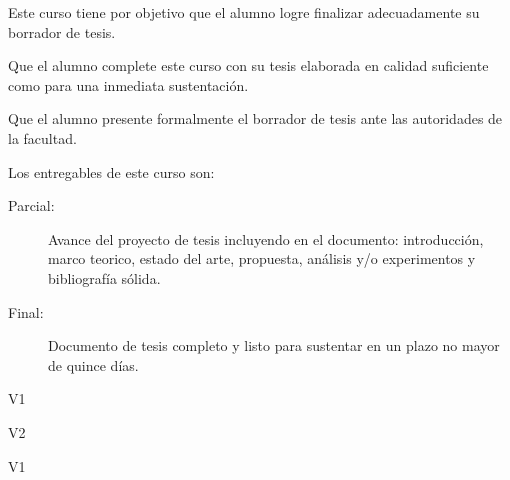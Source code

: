 \begin{syllabus}


\begin{justification}
Este curso tiene por objetivo que el alumno logre finalizar adecuadamente su borrador de tesis.
\end{justification}

\begin{goals}
\item Que el alumno complete este curso con su tesis elaborada en calidad suficiente como para una inmediata sustentación.
\item Que el alumno presente formalmente el borrador de tesis ante las autoridades de la facultad.
\item Los entregables de este curso son:
	\begin{description}
	\item [Parcial:] Avance del proyecto de tesis incluyendo en el documento: introducción, marco teorico, estado del arte, propuesta, análisis y/o experimentos y bibliografía sólida.
	\item [Final:] Documento de tesis completo y listo para sustentar en un plazo no mayor de quince días.
	\end{description}
\end{goals}

\begin{outcomes}{V1}
\item {}
\item {}
\item {}
\item {}
\item {}
\item {}
\item {}
\item {}
\end{outcomes}

\begin{outcomes}{V2}
\item {}
\item {}
\item {}
\item {}
\end{outcomes}

\begin{competences}{V1}
\item {} 
\item {}
\item {}
\end{competences}


\end{syllabus}

